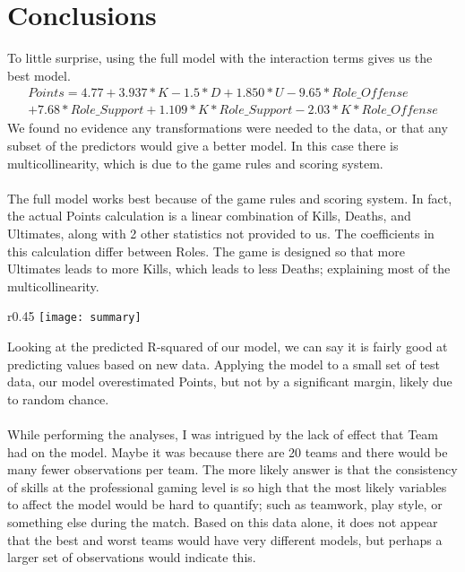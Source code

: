 \documentclass[10pt,letterpaper]{article}
\begin{document}
	\section{Conclusions}
	To little surprise, using the full model with the interaction terms gives us the best model.
	\begin{multline}
		Points = 4.77+3.937*K-1.5*D+1.850*U-9.65*Role\_Offense\\+7.68*Role\_Support+1.109*K*Role\_Support-2.03*K*Role\_Offense
	\end{multline}
	\indent
	We found no evidence any transformations were needed to the data, or that any subset of the predictors would give a better model. In this case there is multicollinearity, which is due to the game rules and scoring system.
	\\
	\\
	\indent
	The full model works best because of the game rules and scoring system. In fact, the actual Points calculation is a linear combination of Kills, Deaths, and Ultimates, along with 2 other statistics not provided to us. The coefficients in this calculation differ between Roles. The game is designed so that more Ultimates leads to more Kills, which leads to less Deaths; explaining most of the multicollinearity.
	\begin{wrapfigure}[5]{r}{0.45\textwidth}
		\texttt{[image: summary]}
	\end{wrapfigure}
	\FloatBarrier
	\indent
	Looking at the predicted R-squared of our model, we can say it is fairly good at predicting values based on new data.
	Applying the model to a small set of test data, our model overestimated Points, but not by a significant margin, likely due to random chance.
	\\
	\\
	\indent
	While performing the analyses, I was intrigued by the lack of effect that Team had on the model. Maybe it was because there are 20 teams and there would be many fewer observations per team. The more likely answer is that the consistency of skills at the professional gaming level is so high that the most likely variables to affect the model would be hard to quantify; such as teamwork, play style, or something else during the match. Based on this data alone, it does not appear that the best and worst teams would have very different models, but perhaps a larger set of observations would indicate this.
\end{document}
